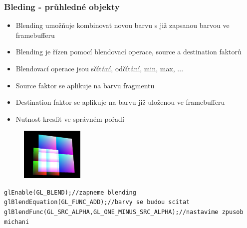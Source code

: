 \begin{frame}[fragile]
\frametitle{Bleding - průhledné objekty}
  \begin{itemize}
  \item Blending umožňuje kombinovat novou barvu s již zapsanou barvou ve framebufferu
  \item Blending je řízen pomocí blendovací operace, source a destination faktorů
  \item Blendovací operace jsou sčítání, odčítání, min, max, ...
  \item Source faktor se aplikuje na barvu fragmentu
  \item Destination faktor se aplikuje na barvu již uloženou ve framebufferu
  \item Nutnost kreslit ve správném pořadí
  \end{itemize}
  \begin{figure}[h]
  \includegraphics[width=3cm,keepaspectratio]{pics/pfo/blending.jpg}
  \end{figure}
  {\scriptsize
\begin{verbatim}
glEnable(GL_BLEND);//zapneme blending
glBlendEquation(GL_FUNC_ADD);//barvy se budou scitat
glBlendFunc(GL_SRC_ALPHA,GL_ONE_MINUS_SRC_ALPHA);//nastavime zpusob michani
  \end{verbatim}
  }
\end{frame}

